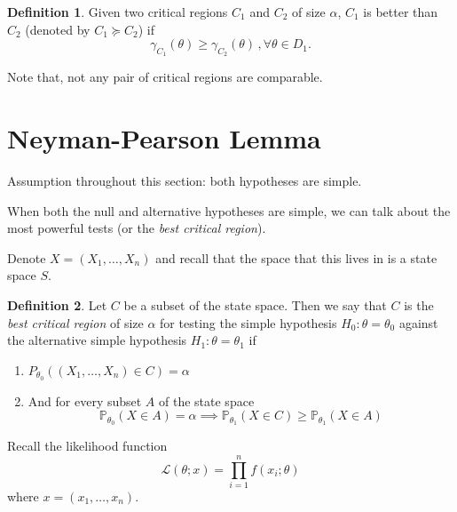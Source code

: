 \documentclass[
  openany]{book}
\theoremstyle{definition}
\newtheorem{definition}{Definition}[chapter]
\theoremstyle{definition}
\theoremstyle{definition}
\theoremstyle{definition}
\theoremstyle{remark}
\begin{document}
\begin{definition}
Given two critical regions \(C_1\) and \(C_2\) of size \(\alpha\), \(C_1\)
is better than \(C_2\) (denoted by \(C_1 \succeq C_2\)) if
\[\gamma_{C_1}(\theta) \geq \gamma_{C_2}(\theta)\,, \forall  \theta \in D_1.\]
\end{definition}

Note that, not any pair of critical regions are comparable.

\section{Neyman-Pearson Lemma}\label{neyman-pearson-lemma}

\begin{bbox}

Assumption throughout this section: both hypotheses are simple.

\end{bbox}

When both the null and alternative hypotheses are simple, we can talk about
the most powerful tests (or the \emph{best critical region}).

Denote \(X = (X_1, \dots, X_n)\) and recall that the space that this lives in
is a state space \(S\).

\begin{definition}

Let \(C\) be a subset of the state space.
Then we say that \(C\) is the \emph{best critical region} of size \(\alpha\) for testing
the simple hypothesis \(H_0: \theta = \theta_0\) against the alternative simple
hypothesis \(H_1: \theta = \theta_1\) if

\begin{enumerate}
\def\labelenumi{\alph{enumi}.}
\item
  \(P_{\theta_0}( (X_1, \dots, X_n) \in C ) = \alpha\)
\item
  And for every subset \(A\) of the state space
  \[ \mathbb{P}_{\theta_0}( X \in A) = \alpha \implies \mathbb{P}_{\theta_1}(X \in C) \geq \mathbb{P}_{\theta_1} ( X \in A)\]
\end{enumerate}

\end{definition}

Recall the likelihood function
\[\mathcal{L}(\theta;x) = \prod_{i=1}^n f(x_i;\theta)\]
where \(x = (x_1, \dots, x_n)\).
\end{document}
